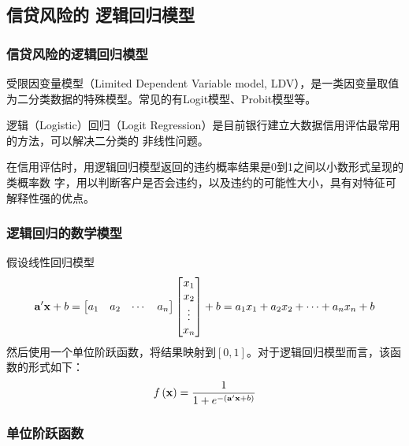 \documentclass[t]{beamer}
\begin{document}
\subsection{信贷风险的
逻辑回归模型}
\begin{frame}[fragile]
  \frametitle{信贷风险的逻辑回归模型}

受限因变量模型（Limited Dependent Variable model, LDV），是一类因变量取值为二分类数据的特殊模型。常见的有Logit模型、Probit模型等。

  逻辑（Logistic）回归（Logit Regression）是目前银行建立大数据信用评估最常用的方法，可以解决二分类的
  非线性问题。
  
  在信用评估时，用逻辑回归模型返回的违约概率结果是0到1之间以小数形式呈现的类概率数
  字，用以判断客户是否会违约，以及违约的可能性大小，具有对特征可解释性强的优点。
\end{frame}

\begin{frame}[fragile]
  \frametitle{逻辑回归的数学模型}
假设线性回归模型
\[{\bf a}'{\bf x}+b = \begin{bmatrix}
  a_1&a_2&\cdots&a_n
\end{bmatrix}\begin{bmatrix}
  x_1\\x_2\\ \vdots \\x_n
\end{bmatrix}+b=a_1x_1+a_2x_2+\cdots+a_nx_n+b \]
然后使用一个单位阶跃函数，将结果映射到$[0,1]$。对于逻辑回归模型而言，该函数的形式如下：
{\LARGE\[ f\,({\bf x})=\frac{1}{1+e^{-({\bf a}'{\bf x}+b)}}\]}



\end{frame}

\begin{frame}[fragile]
  \frametitle{单位阶跃函数}
\begin{center}
\end{center}
\end{frame}  
\end{document}
